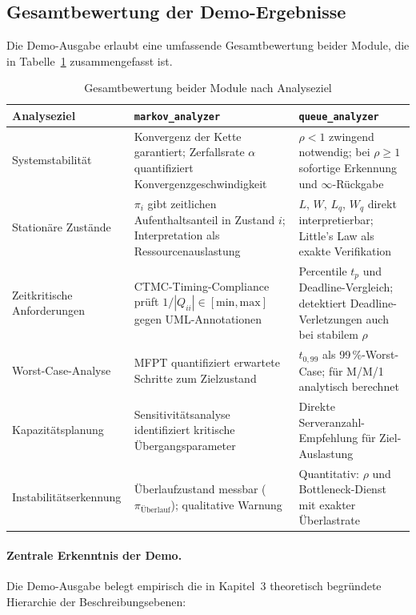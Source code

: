 ﻿\documentclass[a4paper,12pt]{report}
\theoremstyle{definition}
\begin{document}
\subsection{Gesamtbewertung der Demo-Ergebnisse}

Die Demo-Ausgabe erlaubt eine umfassende Gesamtbewertung beider Module,
die in Tabelle~\ref{tab:gesamtbewertung} zusammengefasst ist.

\begin{table}[H]
	\centering
	\begin{tabular}{@{}p{4cm}p{5cm}p{5cm}@{}}
		\toprule
		\textbf{Analyseziel} & \textbf{\texttt{markov\_analyzer}} &
		\textbf{\texttt{queue\_analyzer}} \\
		\midrule
		Systemstabilität & Konvergenz der Kette garantiert;
		Zerfallsrate $\alpha$ quantifiziert Konvergenzgeschwindigkeit &
		$\rho < 1$ zwingend notwendig; bei $\rho \geq 1$ sofortige
		Erkennung und $\infty$-Rückgabe \\
		\addlinespace
		Stationäre Zustände & $\pi_i$ gibt zeitlichen Aufenthaltsanteil
		in Zustand $i$; Interpretation als Ressourcenauslastung &
		$L$, $W$, $L_q$, $W_q$ direkt interpretierbar;
		Little's Law als exakte Verifikation \\
		\addlinespace
		Zeitkritische Anforderungen & CTMC-Timing-Compliance prüft
		$1/|Q_{ii}| \in [\text{min}, \text{max}]$ gegen UML-Annotationen &
		Percentile $t_p$ und Deadline-Vergleich; detektiert
		Deadline-Verletzungen auch bei stabilem $\rho$ \\
		\addlinespace
		Worst-Case-Analyse & MFPT quantifiziert erwartete Schritte
		zum Zielzustand & $t_{0{,}99}$ als 99\,\%-Worst-Case;
		für M/M/1 analytisch berechnet \\
		\addlinespace
		Kapazitätsplanung & Sensitivitätsanalyse identifiziert kritische
		Übergangsparameter & Direkte Serveranzahl-Empfehlung
		für Ziel-Auslastung \\
		\addlinespace
		Instabilitätserkennung & Überlaufzustand messbar ($\pi_\text{Überlauf}$);
		qualitative Warnung & Quantitativ: $\rho$ und Bottleneck-Dienst
		mit exakter Überlastrate \\
		\bottomrule
	\end{tabular}
	\caption{Gesamtbewertung beider Module nach Analyseziel}
	\label{tab:gesamtbewertung}
\end{table}

\paragraph{Zentrale Erkenntnis der Demo.}
Die Demo-Ausgabe belegt empirisch die in Kapitel~3 theoretisch begründete
Hierarchie der Beschreibungsebenen:
\end{document}
